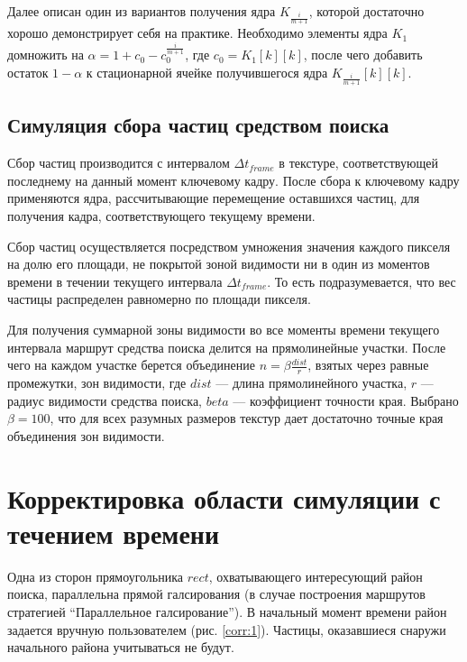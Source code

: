 Далее описан один из вариантов получения ядра $K_{\frac {i} {m + 1}}$, которой достаточно
хорошо демонстрирует себя на практике. Необходимо элементы ядра $K_{1}$ домножить на
$\alpha = 1 + c_0 - c_0^{\frac {i} {m+1}}$, где $c_0 = K_{1}[k][k]$, после чего добавить 
остаток $1 - \alpha$ к стационарной ячейке получившегося ядра $K_{\frac {i} {m + 1}}[k][k]$.
\FloatBarrier
\subsection{Симуляция сбора частиц средством поиска}
Сбор частиц производится с интервалом $\Delta t_{frame}$ в текстуре, соответствующей последнему
на данный момент ключевому кадру. После сбора к ключевому кадру применяются ядра,
рассчитывающие перемещение оставшихся частиц, для получения кадра, соответствующего
текущему времени.

Сбор частиц осуществляется посредством умножения значения каждого пикселя на долю его площади,
не покрытой зоной видимости ни в один из моментов времени в течении текущего интервала
$\Delta t_{frame}$. То есть подразумевается, что вес частицы распределен равномерно по площади
пикселя.

 Для получения суммарной зоны видимости во все моменты времени текущего интервала маршрут
средства поиска делится на прямолинейные участки. После чего на каждом участке берется объединение
$n = \beta \frac{dist}{r}$, взятых через равные промежутки, зон видимости, где $dist$ --- длина
прямолинейного участка, $r$ --- радиус видимости средства поиска, $beta$ --- коэффициент
точности края. Выбрано $\beta = 100$, что для всех разумных размеров текстур дает достаточно точные
края объединения зон видимости.

\FloatBarrier
\section{Корректировка области симуляции с течением времени}
\begin{figure}[ht]
  \centering
\begin{minipage}[t]{.48\textwidth}
  \centering
  \label{corr:1}
\end{minipage}
\begin{minipage}[t]{.48\textwidth}
  \centering
  \label{corr:2}
\end{minipage}
\end{figure}
Одна из сторон прямоугольника $rect$, охватывающего интересующий район поиска, параллельна прямой
галсирования (в случае построения маршрутов стратегией ``Параллельное галсирование''). 
В начальный момент времени район задается вручную пользователем (рис. \ref{corr:1}).
Частицы, оказавшиеся снаружи начального района учитываться не будут.

